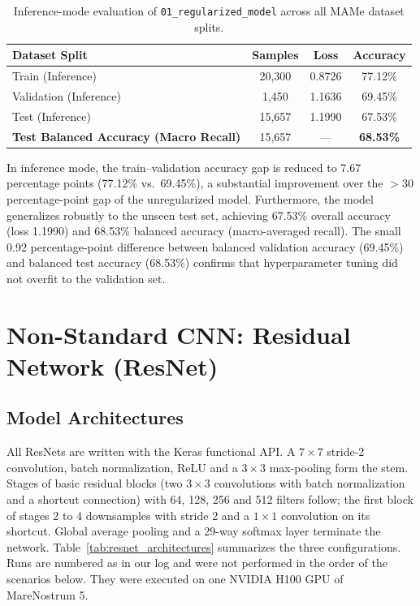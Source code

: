 \documentclass[11pt, a4paper]{article}
\begin{document}
\begin{table}[htbp]
\centering
\caption{Inference-mode evaluation of \texttt{01\_regularized\_model} across all MAMe dataset splits.}
\label{tab:split_eval}
\begin{tabular}{@{}lccc@{}}
\toprule
\textbf{Dataset Split} & \textbf{Samples} & \textbf{Loss} & \textbf{Accuracy} \\
\midrule
Train (Inference) & 20,300 & 0.8726 & 77.12\% \\
Validation (Inference) & 1,450 & 1.1636 & 69.45\% \\
Test (Inference) & 15,657 & 1.1990 & 67.53\% \\
\midrule
\textbf{Test Balanced Accuracy (Macro Recall)} & 15,657 & --- & \textbf{68.53\%} \\
\bottomrule
\end{tabular}
\end{table}

In inference mode, the train--validation accuracy gap is reduced to 7.67 percentage points (77.12\% vs.\ 69.45\%), a substantial improvement over the $>30$ percentage-point gap of the unregularized model. Furthermore, the model generalizes robustly to the unseen test set, achieving 67.53\% overall accuracy (loss 1.1990) and 68.53\% balanced accuracy (macro-averaged recall). The small 0.92 percentage-point difference between balanced validation accuracy (69.45\%) and balanced test accuracy (68.53\%) confirms that hyperparameter tuning did not overfit to the validation set.

\section{Non-Standard CNN: Residual Network (ResNet)}
\label{sec:resnet}

\subsection{Model Architectures}

All ResNets are written with the Keras functional API. A $7 \times 7$ stride-2 convolution, batch normalization, ReLU and a $3 \times 3$ max-pooling form the stem. Stages of basic residual blocks (two $3 \times 3$ convolutions with batch normalization and a shortcut connection) with 64, 128, 256 and 512 filters follow; the first block of stages 2 to 4 downsamples with stride 2 and a $1 \times 1$ convolution on its shortcut. Global average pooling and a 29-way softmax layer terminate the network. Table~\ref{tab:resnet_architectures} summarizes the three configurations. Runs are numbered as in our log and were not performed in the order of the scenarios below. They were executed on one NVIDIA H100 GPU of MareNostrum 5.
\end{document}
